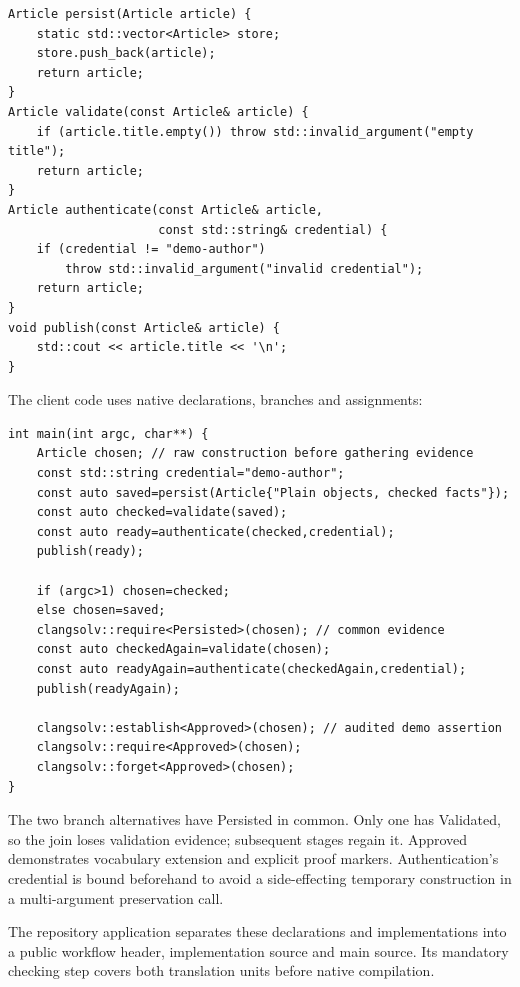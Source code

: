 \documentclass[11pt]{article}
\begin{document}
\begin{lstlisting}
Article persist(Article article) {
    static std::vector<Article> store;
    store.push_back(article);
    return article;
}
Article validate(const Article& article) {
    if (article.title.empty()) throw std::invalid_argument("empty title");
    return article;
}
Article authenticate(const Article& article,
                     const std::string& credential) {
    if (credential != "demo-author")
        throw std::invalid_argument("invalid credential");
    return article;
}
void publish(const Article& article) {
    std::cout << article.title << '\n';
}
\end{lstlisting}
The client code uses native declarations, branches and assignments:
\begin{lstlisting}
int main(int argc, char**) {
    Article chosen; // raw construction before gathering evidence
    const std::string credential="demo-author";
    const auto saved=persist(Article{"Plain objects, checked facts"});
    const auto checked=validate(saved);
    const auto ready=authenticate(checked,credential);
    publish(ready);

    if (argc>1) chosen=checked;
    else chosen=saved;
    clangsolv::require<Persisted>(chosen); // common evidence
    const auto checkedAgain=validate(chosen);
    const auto readyAgain=authenticate(checkedAgain,credential);
    publish(readyAgain);

    clangsolv::establish<Approved>(chosen); // audited demo assertion
    clangsolv::require<Approved>(chosen);
    clangsolv::forget<Approved>(chosen);
}
\end{lstlisting}
The two branch alternatives have Persisted in common. Only one has Validated,
so the join loses validation evidence; subsequent stages regain it. Approved
demonstrates vocabulary extension and explicit proof markers. Authentication's
credential is bound beforehand to avoid a side-effecting temporary construction
in a multi-argument preservation call.

The repository application separates these declarations and implementations
into a public workflow header, implementation source and main source. Its
mandatory checking step covers both translation units before native compilation.
\end{document}
